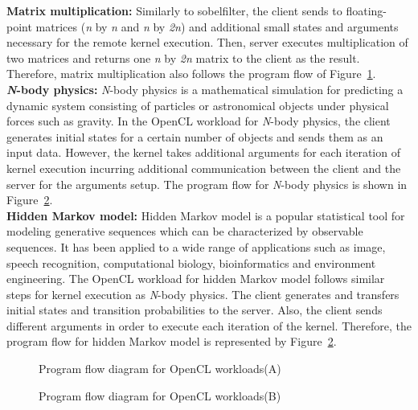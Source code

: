 %
{\bf Matrix multiplication:} Similarly to sobelfilter, the client
sends to floating-point matrices ({\it n} by {\it n} and
{\it n} by {\it 2n}) and additional small states and
arguments necessary for the remote kernel execution.
%
Then, server executes multiplication of two matrices and returns one
{\it n} by {\it 2n} matrix to the client as the result.
%
Therefore, matrix multiplication also follows the program flow of
Figure~\ref{fig:program_flow1}.\\
%
{\bf {\it N}-body physics:} {\it N}-body physics is a
mathematical simulation for predicting a dynamic system consisting of
particles or astronomical objects under physical forces such as gravity.
%
In the OpenCL workload for {\it N}-body physics, the client generates
initial states for a certain number of objects and sends them as an
input data.
%
However, the kernel takes additional arguments for each iteration of
kernel execution incurring additional communication between the client
and the server for the arguments setup.
%
The program flow for {\it N}-body physics is shown in
Figure~\ref{fig:program_flow2}.\\
%
{\bf Hidden Markov model:} Hidden Markov model is a popular
statistical tool for modeling generative sequences which can be
characterized by observable sequences.
%
It has been applied to a wide range of applications such as image,
speech recognition, computational biology, bioinformatics and
environment engineering.
%
The OpenCL workload for hidden Markov model follows similar steps for
kernel execution as \textit{N}-body physics.
%
The client generates and transfers initial states and transition
probabilities to the server.
%
Also, the client sends different arguments in order to execute each
iteration of the kernel.
%
Therefore, the program flow for hidden Markov model is represented by
Figure~\ref{fig:program_flow2}.
%
\begin{figure}
\centering
{}
\caption{Program flow diagram for OpenCL workloads(A)}
\label{fig:program_flow1}
\end{figure}
%
\begin{figure}
\centering
{}
\caption{Program flow diagram for OpenCL workloads(B)}
\label{fig:program_flow2}
\end{figure}
%
